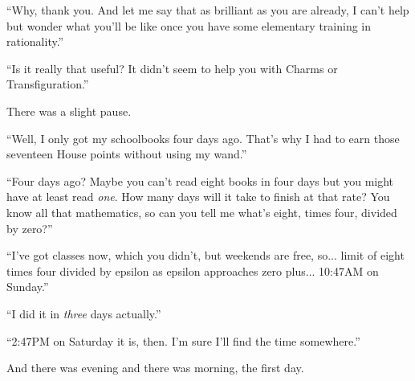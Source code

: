 ``Why, thank you. And let me say that as brilliant as you are already, I
can't help but wonder what you'll be like once you have some elementary
training in rationality.''

``Is it really that useful? It didn't seem to help you with Charms or
Transfiguration.''

There was a slight pause.

``Well, I only got my schoolbooks four days ago. That's why I had to
earn those seventeen House points without using my wand.''

``Four days ago? Maybe you can't read eight books in four days but you
might have at least read \emph{one}. How many days will it take to
finish at that rate? You know all that mathematics, so can you tell me
what's eight, times four, divided by zero?''

``I've got classes now, which you didn't, but weekends are free,
so... limit of eight times four divided by epsilon as epsilon
approaches zero plus... 10:47AM on Sunday.''

``I did it in \emph{three} days actually.''

``2:47PM on Saturday it is, then. I'm sure I'll find the time
somewhere.''

And there was evening and there was morning, the first day.

